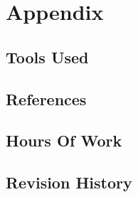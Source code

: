 \section{Appendix}
\subsection{Tools Used}
\subsection{References}
\subsection{Hours Of Work}
\subsection{Revision History}
